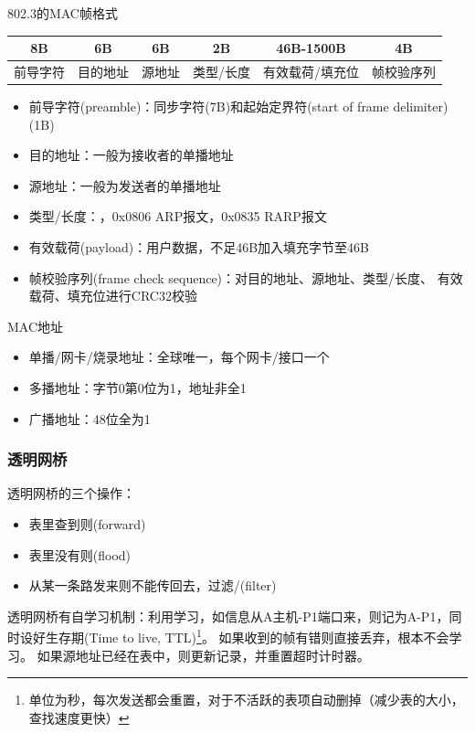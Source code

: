 \myhline
802.3的MAC帧格式
\begin{center}
\begin{tabular}{|c|c|c|c|c|c|}\hline
8B & 6B & 6B & 2B & 46B-1500B & 4B\\\hline
前导字符 & 目的地址 & 源地址 & 类型/长度 & 有效载荷/填充位 & 帧校验序列\\\hline
\end{tabular}
\end{center}
\begin{itemize}
\item 前导字符(preamble)：同步字符(7B)和起始定界符(start of frame delimiter)(1B)
\item 目的地址：一般为接收者的单播地址
\item 源地址：一般为发送者的单播地址
\item 类型/长度：，0x0806 ARP报文，0x0835 RARP报文
\item 有效载荷(payload)：用户数据，不足46B加入填充字节至46B
\item 帧校验序列(frame check sequence)：对目的地址、源地址、类型/长度、
有效载荷、填充位进行CRC32校验
\end{itemize}

\myhline
MAC地址
\begin{itemize}
	\item 单播/网卡/烧录地址：全球唯一，每个网卡/接口一个
	\item 多播地址：字节0第0位为1，地址非全1
	\item 广播地址：48位全为1
\end{itemize}

\subsubsection{透明网桥}
透明网桥的三个操作：
\begin{itemize}
	\item 表里查到则\underline{}(forward)
	\item 表里没有则\underline{}(flood)
	\item 从某一条路发来则不能传回去，过滤/\underline{}(filter)
\end{itemize}

透明网桥有自学习机制：利用学习，如信息从A主机-P1端口来，则记为A-P1，同时设好生存期(Time to live, TTL)\footnote{单位为秒，每次发送都会重置，对于不活跃的表项自动删掉（减少表的大小，查找速度更快）}。
如果收到的帧有错则直接丢弃，根本不会学习。
如果源地址已经在表中，则更新记录，并重置超时计时器。

